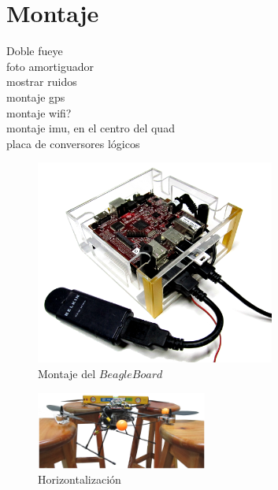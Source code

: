 \documentclass[main]{subfiles}
\begin{document}
\chapter{Montaje}
\label{chap:camara}

Doble fueye\\
foto amortiguador\\
mostrar ruidos\\
montaje gps\\
montaje wifi?\\
montaje imu, en el centro del quad\\
placa de conversores lógicos\\


\begin{figure}[h!]
	\centering
		\includegraphics[width=0.7\textwidth]{./pics_montaje/beagle.jpg}
	\caption{Montaje del $BeagleBoard$}
	\label{fig:beagle}
\end{figure}


\begin{figure}
	\begin{center}
		\includegraphics[width=0.5\textwidth]{./pics_montaje/horizontalidad.jpg}
	\end{center}
	\caption{Horizontalización}
	\label{fig:horizontalidad}
\end{figure}
\end{document}
